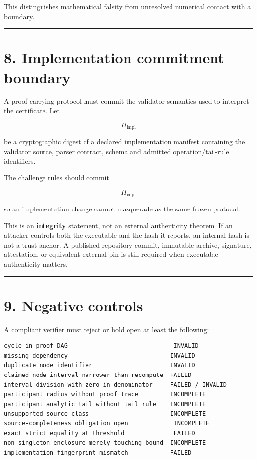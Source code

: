 This distinguishes mathematical falsity from unresolved numerical contact with a boundary.

\begin{center}\rule{0.5\linewidth}{0.5pt}\end{center}

\hypertarget{implementation-commitment-boundary}{%
\section{8. Implementation commitment boundary}\label{implementation-commitment-boundary}}

A proof-carrying protocol must commit the validator semantics used to interpret the certificate. Let

\[
H_{\mathrm{impl}}
\]

be a cryptographic digest of a declared implementation manifest containing the validator source, parser contract, schema and admitted operation/tail-rule identifiers.

The challenge rules should commit

\[
\boxed{H_{\mathrm{impl}}}
\tag{8.1}
\]

so an implementation change cannot masquerade as the same frozen protocol.

This is an \textbf{integrity} statement, not an external authenticity theorem. If an attacker controls both the executable and the hash it reports, an internal hash is not a trust anchor. A published repository commit, immutable archive, signature, attestation, or equivalent external pin is still required when executable authenticity matters.

\begin{center}\rule{0.5\linewidth}{0.5pt}\end{center}

\hypertarget{negative-controls}{%
\section{9. Negative controls}\label{negative-controls}}

A compliant verifier must reject or hold open at least the following:

\begin{verbatim}
cycle in proof DAG                              INVALID
missing dependency                             INVALID
duplicate node identifier                      INVALID
claimed node interval narrower than recompute  FAILED
interval division with zero in denominator     FAILED / INVALID
participant radius without proof trace         INCOMPLETE
participant analytic tail without tail rule    INCOMPLETE
unsupported source class                       INCOMPLETE
source-completeness obligation open             INCOMPLETE
exact strict equality at threshold              FAILED
non-singleton enclosure merely touching bound  INCOMPLETE
implementation fingerprint mismatch            FAILED
\end{verbatim}

